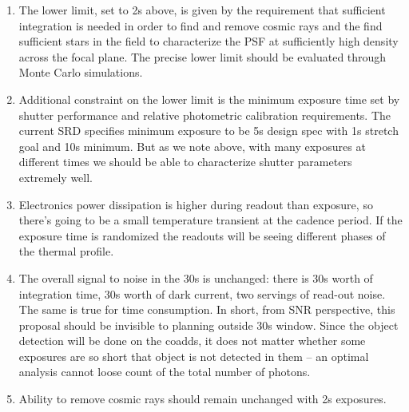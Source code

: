 \documentclass[12pt, a4paper]{article}
\begin{document}
\begin{enumerate}
\item The lower limit, set to 2s above, is given by the requirement
  that sufficient integration is needed in order to find and remove
  cosmic rays and the find sufficient stars in the field to
  characterize the PSF at sufficiently high density across the focal
  plane. The precise lower limit should be evaluated through Monte Carlo
  simulations.

\item Additional constraint on the lower limit is the minimum exposure
  time set by shutter performance and relative photometric calibration
  requirements. The current SRD specifies minimum exposure to be 5s
  design spec with 1s stretch goal and 10s minimum. But as we note
  above, with many exposures at different times we should be able to
  characterize shutter parameters extremely well.

\item Electronics power dissipation is higher during readout than
  exposure, so there's going to be a small temperature transient at
  the cadence period. If the exposure time is randomized the readouts
  will be seeing different phases of the thermal profile.

\item The overall signal to noise in the 30s is unchanged: there is
  30s worth of integration time, 30s worth of dark current, two
  servings of read-out noise. The same is true for time
  consumption. In short, from SNR perspective, this proposal should be
  invisible to planning outside 30s window. Since the object detection
  will be done on the coadds, it does not matter whether some
  exposures are so short that object is not detected in them -- an
  optimal analysis cannot loose count of the total number of photons.

\item Ability to remove cosmic rays should remain unchanged with 2s
  exposures.
\end{enumerate}
\end{document}
